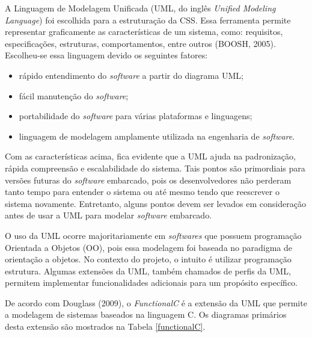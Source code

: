 A Linguagem de Modelagem Unificada (UML, do inglês \textit{Unified Modeling Language}) foi escolhida para a estruturação da CSS. Essa ferramenta permite representar graficamente as características de um sistema, como: requisitos, especificações, estruturas, comportamentos, entre outros (BOOSH, 2005). Escolheu-se essa linguagem devido os seguintes fatores:

\begin{itemize}
\item rápido entendimento do \textit{software} a partir do diagrama UML;

\item fácil manutenção do \textit{software};

\item portabilidade do \textit{software} para várias plataformas e linguagens;

\item linguagem de modelagem amplamente utilizada na engenharia de \textit{software}.
\end{itemize}

 
Com as características acima, fica evidente que a UML ajuda na padronização, rápida compreensão e escalabilidade do sistema. Tais pontos são primordiais para versões futuras do \textit{software} embarcado, pois os desenvolvedores não perderam tanto tempo para entender o sistema ou até mesmo tendo que reescrever o sistema novamente. Entretanto, alguns pontos devem ser levados em consideração antes de usar a UML para modelar \textit{software} embarcado.

	O uso da UML ocorre majoritariamente em \textit{softwares} que possuem programação Orientada a Objetos (OO), pois essa modelagem foi baseada no paradigma de orientação a objetos. No contexto do projeto, o intuito é utilizar programação estrutura. Algumas extensões da UML, também chamados de perfis da UML, permitem implementar funcionalidades adicionais para um propósito específico.
    
De acordo com Douglass (2009), o \textit{FunctionalC} é a extensão da UML que permite a modelagem de sistemas baseados na linguagem C. Os diagramas primários desta extensão são mostrados na Tabela \ref{functionalC}. 


